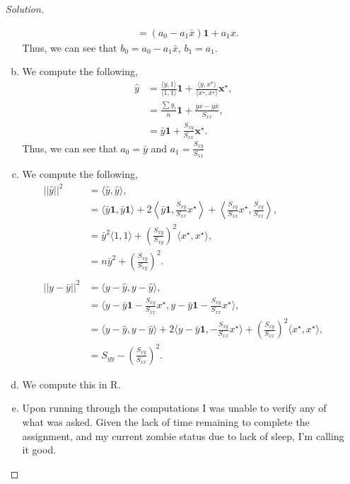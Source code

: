 \documentclass{amsart}
\begin{document}
\begin{enumerate}
\begin{proof}[Solution]
\begin{enumerate}[(a)]
\begin{align*}
						&= \left(a_{0} - a_{1}\bar{x}\right)\mathbf{1} + a_{1}x.
					\end{align*}
				Thus, we can see that $b_{0} = a_{0} - a_{1}\bar{x}$, $b_{1} = a_{1}$.
				\item We compute the following,
					\begin{align*}
						\hat{y} &= \frac{\langle y, 1 \rangle}{\langle 1,1 \rangle} \mathbf{1} + \frac{\langle y , x^{\star} \rangle}{\langle x^{\star}, x^{\star} \rangle} \mathbf{x}^{\star}, \\
						&= \frac{\sum y_{i}}{n} \mathbf{1} + \frac{yx - y\bar{x}}{S_{xx}}, \\
						&= \bar{y}\mathbf{1} + \frac{S_{xy}}{S_{xx}}\mathbf{x}^{\star}.
					\end{align*}
				Thus, we can see that $a_{0} = \bar{y}$ and $a_{1} = \frac{S_{xy}}{S_{xx}}$
				\item We compute the following,
					\begin{align*}
						||\hat{y}||^{2} &= \langle \hat{y} , \hat{y} \rangle, \\
						&= \langle \bar{y}\mathbf{1}, \bar{y}\mathbf{1}\rangle + 2\left\langle \bar{y}\mathbf{1}, \frac{S_{xy}}{S_{xx}}x^{\star} \right\rangle + \left\langle \frac{S_{xy}}{S_{xx}}x^{\star}, \frac{S_{xy}}{S_{xx}} \right\rangle, \\
						&= \bar{y}^{2}\langle 1,1 \rangle + \left(\frac{S_{xy}}{S_{xy}} \right)^{2}\langle x^{\star},x^{\star} \rangle, \\
						&= n\bar{y}^{2} + \left(\frac{S_{xy}}{S_{xy}} \right)^{2}. \\
						\\
						|| y - \bar{y} ||^{2} &= \langle y - \hat{y}, y-\hat{y}\rangle, \\
						&= \langle y - \bar{y}\mathbf{1} - \frac{S_{xy}}{S_{xx}}x^{\star}, y - \bar{y}\mathbf{1} - \frac{S_{xy}}{S_{xx}}x^{\star} \rangle, \\
						&= \langle y - \hat{y}, y-\hat{y}\rangle + 2\langle y - \bar{y}\mathbf{1}, - \frac{S_{xy}}{S_{xx}}x^{\star} \rangle + \left(\frac{S_{xy}}{S_{xx}}\right)^{2}\langle x^{\star},x^{\star} \rangle, \\
						&= S_{yy} - \left(\frac{S_{xy}}{S_{xx}}\right)^{2}.
					\end{align*}
				\item We compute this in R.
				\item Upon running through the computations I was unable to verify any of what was asked. 
				Given the lack of time remaining to complete the assignment, and my current zombie status due to lack of sleep, I'm calling it good.
			\end{enumerate}
		\end{proof}
		\newpage


\end{enumerate}
\end{document}
